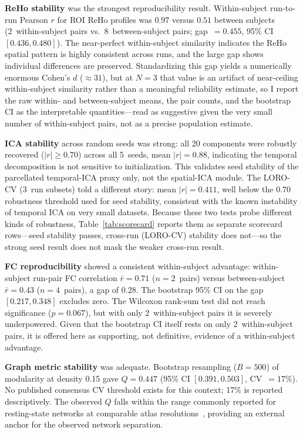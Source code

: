\documentclass[12pt]{article}
\begin{document}
\textbf{ReHo stability} was the strongest reproducibility result.
Within-subject run-to-run Pearson $r$ for ROI ReHo profiles was
$0.97$ versus $0.51$ between subjects (2~within-subject pairs vs.\
8~between-subject pairs; gap~$= 0.455$, 95\% CI $[0.436, 0.480]$). The
near-perfect within-subject similarity indicates the ReHo spatial
pattern is highly consistent across runs, and the large gap shows
individual differences are preserved. Standardizing this gap yields a
numerically enormous Cohen's $d$ ($\approx 31$), but at $N = 3$ that
value is an artifact of near-ceiling within-subject similarity rather
than a meaningful reliability estimate, so I report the raw within- and
between-subject means, the pair counts, and the bootstrap CI as the
interpretable quantities---read as suggestive given the very small
number of within-subject pairs, not as a precise population estimate.

\textbf{ICA stability} across random seeds was strong: all 20
components were robustly recovered ($|r| \geq 0.70$) across all
5~seeds, mean $|r| = 0.88$, indicating the temporal decomposition is
not sensitive to initialization. This validates seed stability of the
parcellated temporal-ICA proxy only, not the spatial-ICA module. The
LORO-CV (3~run subsets) told a different story: mean $|r| = 0.411$,
well below the $0.70$ robustness threshold used for seed stability,
consistent with the known instability of temporal ICA on very small
datasets. Because these two tests probe different kinds of robustness,
Table~\ref{tab:scorecard} reports them as separate scorecard
rows---seed stability passes, cross-run (LORO-CV) stability does
not---so the strong seed result does not mask the weaker cross-run
result.

\textbf{FC reproducibility} showed a consistent within-subject
advantage: within-subject run-pair FC correlation $\bar{r} = 0.71$
($n = 2$~pairs) versus between-subject $\bar{r} = 0.43$ ($n = 4$~pairs),
a gap of 0.28. The bootstrap 95\% CI on the gap $[0.217, 0.348]$
excludes zero. The Wilcoxon rank-sum test did not reach significance
($p = 0.067$), but with only 2~within-subject pairs it is severely
underpowered. Given that the bootstrap CI itself rests on only
2~within-subject pairs, it is offered here as supporting, not
definitive, evidence of a within-subject advantage.

\textbf{Graph metric stability} was adequate. Bootstrap resampling
($B = 500$) of modularity at density 0.15 gave $Q = 0.447$
(95\% CI $[0.391, 0.503]$, CV~$= 17\%$). No published consensus CV
threshold exists for this context; 17\% is reported descriptively. The
observed $Q$ falls within the range commonly reported for resting-state
networks at comparable atlas resolutions~\citep{bullmore2009complex},
providing an external anchor for the observed network separation.
\end{document}

